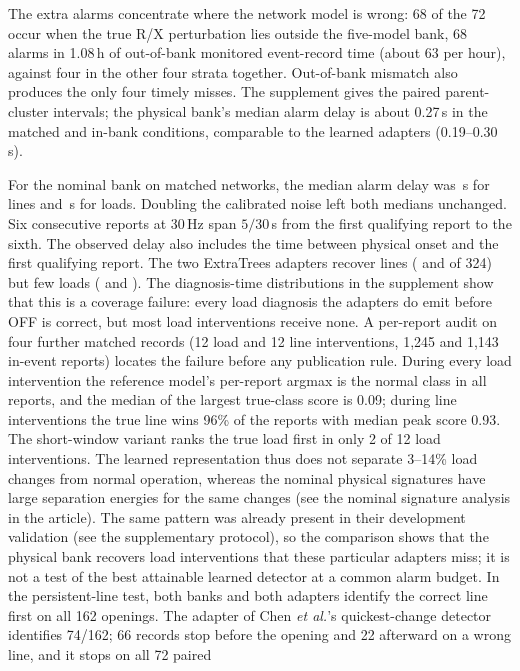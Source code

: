 The extra alarms concentrate where the network model is wrong: 68 of the
72 occur when the true R/X perturbation lies outside the five-model bank,
68 alarms in 1.08\,h of out-of-bank monitored event-record time (about 63
per hour), against four in the other four strata together. Out-of-bank mismatch also produces the only
four timely misses. The supplement gives the paired parent-cluster
intervals; the physical bank's median alarm delay is about 0.27\,s in the
matched and in-bank conditions, comparable to the learned adapters
(0.19--0.30\,s).

For the nominal bank on matched networks, the median alarm delay was
\RevObsLineDelay\,s for lines and \RevObsLoadDelay\,s for loads. Doubling
the calibrated noise left both medians unchanged. Six consecutive reports
at 30\,Hz span $5/30$\,s from the first qualifying report to the sixth.
The observed delay also includes the time between physical onset and the
first qualifying report.
The two ExtraTrees adapters recover lines (\ReaderETLine{} and
\ReaderETShortLine{} of 324) but few loads (\ReaderETLoad{} and
\ReaderETShortLoad{}). The diagnosis-time distributions in the supplement show that this is a
coverage failure: every load diagnosis the adapters do emit before OFF is
correct, but most load interventions receive none. A per-report audit on
four further matched records (12 load and 12 line interventions,
1{,}245 and 1{,}143 in-event reports) locates the failure before any
publication rule. During every load intervention the reference model's
per-report argmax is the normal class in all reports, and the median of
the largest true-class score is 0.09; during line interventions the true
line wins 96\% of the reports with median peak score 0.93. The short-window
variant ranks the true load first in only 2 of 12 load interventions. The
learned representation thus does not separate 3--14\% load changes from
normal operation, whereas the nominal physical signatures have large separation energies
for the same changes (see the nominal signature analysis in the article). The same pattern was already present in
their development validation (see the supplementary protocol), so the
comparison shows that the physical bank recovers load interventions that
these particular adapters miss; it is not a test of the best attainable
learned detector at a common alarm budget.
In the persistent-line test, both banks and both adapters identify the
correct line first on all 162 openings. The adapter of Chen \emph{et al.}'s
quickest-change detector identifies 74/162; 66 records stop before the
opening and 22 afterward on a wrong line, and it stops on all 72 paired
